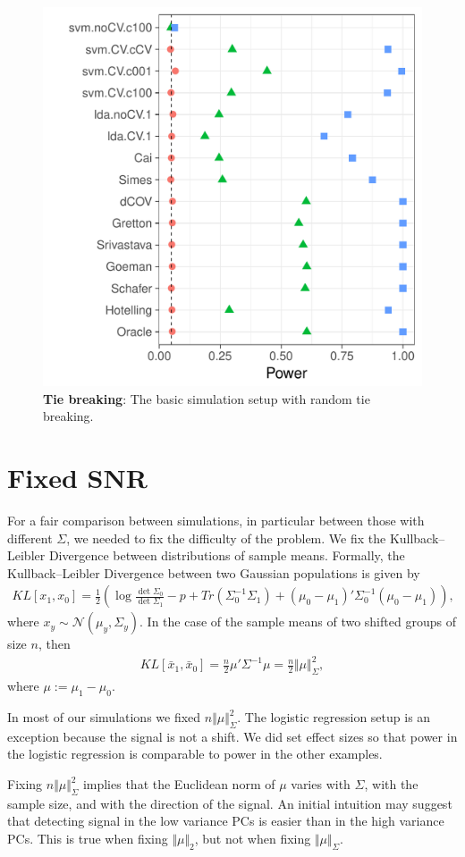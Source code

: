\documentclass[oupdraft]{bio}
\begin{document}
\begin{figure}[ht]
	\centering
	\includegraphics[width=0.5\columnwidth]{file33}
	\caption{\textbf{Tie breaking}: The basic simulation setup with random tie breaking.}
	\label{fig:file33}
\end{figure}




\section{Fixed SNR}
\label{sec:fix_snr}

For a fair comparison between simulations, in particular between those with different $\Sigma$, we needed to fix the difficulty of the problem.
We fix the Kullback–Leibler Divergence between distributions of sample means. 
Formally, the Kullback–Leibler Divergence between two Gaussian populations is given by 
\begin{align}
\label{eq:KLD}
KL[x_1,x_0]=\frac{1}{2}\left(
\log \frac{\det \Sigma_0}{\det \Sigma_1}-p+Tr(\Sigma_0^{-1}\Sigma_1)+(\mu_0-\mu_1)'\Sigma^{-1}_0(\mu_0-\mu_1)
\right),
\end{align}
where $x_y\sim\mathcal{N}(\mu_y,\Sigma_y)$.
In the case of the sample means of two shifted groups of size $n$, then 
\begin{align}
\label{eq:mahalanobis}
KL[\bar x_1,\bar x_0]=
\frac{n}{2}\mu'\Sigma^{-1}\mu=
\frac{n}{2}\Vert \mu \Vert_\Sigma^2,
\end{align}
where $\mu:=\mu_1-\mu_0$. 

In most of our simulations we fixed $n \Vert \mu \Vert_\Sigma^2$. 
The logistic regression setup is an exception because the signal is not a shift. 
We did set effect sizes so that power in the logistic regression is comparable to power in the other examples.

Fixing $n \Vert \mu \Vert_\Sigma^2$ implies that the Euclidean norm of $\mu$ varies with $\Sigma$, with the sample size, and with the direction of the signal.
An initial intuition may suggest that detecting signal in the low variance PCs is easier than in the high variance PCs. 
This is true when fixing $\Vert \mu \Vert_2$, but not when fixing $\Vert \mu \Vert_{\Sigma}$.
\end{document}
